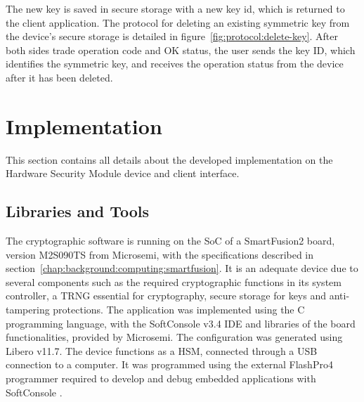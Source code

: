 The new key is saved in secure storage with a new key id, which is returned to the client application.
The protocol for deleting an existing symmetric key from the device's secure storage is detailed in figure~\ref{fig:protocol:delete-key}.
After both sides trade operation code and OK status, the user sends the key ID, which identifies the symmetric key, and receives the operation status from the device after it has been deleted.

\section{Implementation}\label{chap:implementation:app}

This section contains all details about the developed implementation on the Hardware Security Module device and client interface.

\subsection{Libraries and Tools}\label{chap:implementation:app:tools}

The cryptographic software is running on the \ac{SoC} of a SmartFusion2 board, version M2S090TS from Microsemi, with the specifications described in section~\ref{chap:background:computing:smartfusion}. It is an adequate device due to several components such as the required cryptographic functions in its system controller, a \ac{TRNG} essential for cryptography, secure storage for keys and anti-tampering protections.
The application was implemented using the C programming language, with the SoftConsole v3.4 \ac{IDE} and libraries of the board functionalities, provided by Microsemi. The configuration was generated using Libero v11.7.
The device functions as a \ac{HSM}, connected through a \ac{USB} connection to a computer. It was programmed using the external FlashPro4 programmer required to develop and debug embedded applications with SoftConsole \cite{smartfusionSecurityPractices}.

